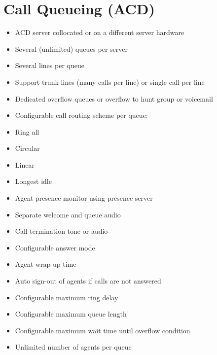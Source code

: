 \documentclass[letterpaper,10pt,english]{sphinxmanual}
\begin{document}
\section{Call Queueing (ACD)}
\label{\detokenize{features:call-queueing-acd}}\begin{itemize}
\item {} 
ACD server collocated or on a different server hardware

\item {} 
Several (unlimited) queues per server

\item {} 
Several lines per queue

\item {} 
Support trunk lines (many calls per line) or single call per line

\item {} 
Dedicated overflow queues or overflow to hunt group or voicemail

\item {} 
Configurable call routing scheme per queue:

\item {} 
Ring all

\item {} 
Circular

\item {} 
Linear

\item {} 
Longest idle

\item {} 
Agent presence monitor using presence server

\item {} 
Separate welcome and queue audio

\item {} 
Call termination tone or audio

\item {} 
Configurable answer mode

\item {} 
Agent wrap-up time

\item {} 
Auto sign-out of agents if calls are not answered

\item {} 
Configurable maximum ring delay

\item {} 
Configurable maximum queue length

\item {} 
Configurable maximum wait time until overflow condition

\item {} 
Unlimited number of agents per queue

\end{itemize}
\end{document}

